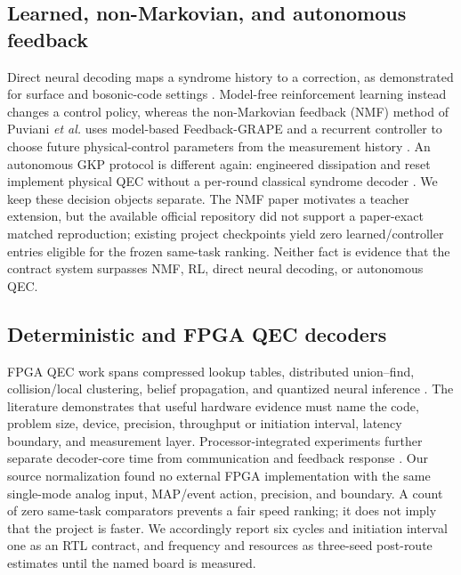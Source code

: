 \documentclass[11pt]{article}
\begin{document}
\subsection{Learned, non-Markovian, and autonomous feedback}

Direct neural decoding maps a syndrome history to a correction, as demonstrated
for surface and bosonic-code settings \cite{bausch2024,wang2022}.  Model-free
reinforcement learning instead changes a control policy, whereas the
non-Markovian feedback (NMF) method of Puviani \emph{et al.} uses model-based
Feedback-GRAPE and a recurrent controller to choose future physical-control
parameters from the measurement history \cite{sivak2026,puviani2025}.  An
autonomous GKP protocol is different again: engineered dissipation and reset
implement physical QEC without a per-round classical syndrome decoder
\cite{lachance2024}.  We keep these decision objects separate.  The NMF paper
motivates a teacher extension, but the available official repository did not
support a paper-exact matched reproduction; existing project checkpoints yield
zero learned/controller entries eligible for the frozen same-task ranking.
Neither fact is evidence that the contract system surpasses NMF, RL, direct
neural decoding, or autonomous QEC.

\subsection{Deterministic and FPGA QEC decoders}

FPGA QEC work spans compressed lookup tables, distributed union--find,
collision/local clustering, belief propagation, and quantized neural inference
\cite{lilliput2022,helios2023,collision2025,ziad2024,maurer2025,yang2026}.
The literature demonstrates that useful hardware evidence must name the code,
problem size, device, precision, throughput or initiation interval, latency
boundary, and measurement layer.  Processor-integrated experiments further
separate decoder-core time from communication and feedback response
\cite{caune2024,yang2026}.  Our source normalization found no external FPGA
implementation with the same single-mode analog input, MAP/event action,
precision, and boundary.  A count of zero same-task comparators prevents a fair
speed ranking; it does not imply that the project is faster.  We accordingly
report six cycles and initiation interval one as an RTL contract, and frequency
and resources as three-seed post-route estimates until the named board is
measured.
\end{document}
